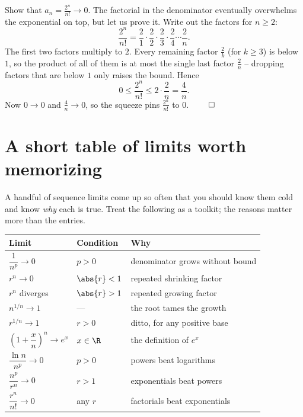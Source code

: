 \begin{example}
\label{ch28:ex-factorial}
Show that $\displaystyle a_n = \frac{2^n}{n!} \to 0$. The factorial in the
denominator eventually overwhelms the exponential on top, but let us prove it.
Write out the factors for $n \ge 2$:
\[
  \frac{2^n}{n!}
  = \frac{2}{1}\cdot\frac{2}{2}\cdot\frac{2}{3}\cdot\frac{2}{4}\cdots\frac{2}{n}.
\]
The first two factors multiply to $2$. Every remaining factor $\tfrac{2}{k}$
(for $k \ge 3$) is below $1$, so the product of all of them is at most the single
last factor $\tfrac2n$ -- dropping factors that are below $1$ only raises the
bound. Hence
\[
  0 \le \frac{2^n}{n!} \le 2 \cdot \frac{2}{n} = \frac{4}{n}.
\]
Now $0 \to 0$ and $\tfrac4n \to 0$, so the squeeze pins $\tfrac{2^n}{n!}$ to $0$.
$\qed$
\end{example}

\section{A short table of limits worth memorizing}
\label{ch28:key-limits}

A handful of sequence limits come up so often that you should know them cold and
know \emph{why} each is true. Treat the following as a toolkit; the reasons matter
more than the entries.

\begin{center}
\renewcommand{\arraystretch}{1.5}
\begin{tabular}{@{}lll@{}}
\toprule
\textbf{Limit} & \textbf{Condition} & \textbf{Why} \\
\midrule
$\dfrac1{n^p} \to 0$ & $p > 0$ & denominator grows without bound \\
$r^n \to 0$ & $\abs{r} < 1$ & repeated shrinking factor \\
$r^n$ diverges & $\abs{r} > 1$ & repeated growing factor \\
$n^{1/n} \to 1$ & --- & the root tames the growth \\
$r^{1/n} \to 1$ & $r > 0$ & ditto, for any positive base \\
$\left(1 + \dfrac{x}{n}\right)^{\!n} \to e^x$ & $x \in \R$ & the definition of $e^x$ \\
$\dfrac{\ln n}{n^p} \to 0$ & $p > 0$ & powers beat logarithms \\
$\dfrac{n^p}{r^n} \to 0$ & $r > 1$ & exponentials beat powers \\
$\dfrac{r^n}{n!} \to 0$ & any $r$ & factorials beat exponentials \\
\bottomrule
\end{tabular}
\end{center}

